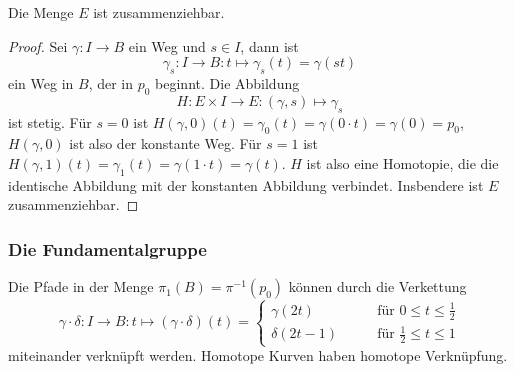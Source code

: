 \begin{satz}
Die Menge $E$ ist zusammenziehbar.
\end{satz}

\begin{proof}
Sei $\gamma\colon I \to B$ ein Weg und $s\in I$, dann ist
\[
\gamma_s
\colon
I \to B
:
t \mapsto \gamma_s(t) = \gamma(st)
\]
ein Weg in $B$, der in $p_0$ beginnt.
Die Abbildung
\[
H
\colon
E\times I \to E
:
(\gamma,s)\mapsto \gamma_s
\]
ist stetig.
Für $s=0$ ist $H(\gamma,0)(t) = \gamma_0(t) = \gamma(0\cdot t) = \gamma(0)=p_0$,
$H(\gamma,0)$ ist also der konstante Weg.
Für $s=1$ ist $H(\gamma,1)(t) = \gamma_1(t) = \gamma(1\cdot t) = \gamma(t)$.
$H$ ist also eine Homotopie, die die identische Abbildung mit der konstanten
Abbildung verbindet.
Insbendere ist $E$ zusammenziehbar.
\end{proof}

%
%
\subsubsection{Die Fundamentalgruppe}
Die Pfade in der Menge $\pi_1(B)=\pi^{-1}(p_0)$ können durch die
Verkettung
\[
\gamma\cdot \delta
\colon
I\to B
:
t
\mapsto
(\gamma\cdot\delta)(t)
=
\begin{cases}
\gamma(2t)&\qquad \text{für $0\le t\le \frac12$}\\
\delta(2t-1)&\qquad \text{für $\frac12\le t\le 1$}
\end{cases}
\]
miteinander verknüpft werden.
Homotope Kurven haben homotope Verknüpfung.

